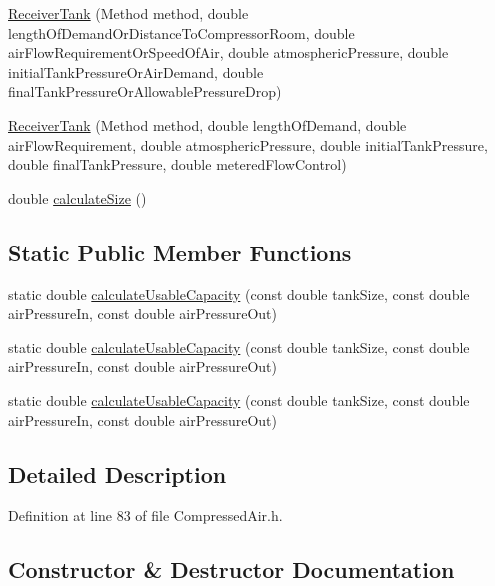 \begin{DoxyCompactItemize}
\item 
\hyperlink{class_receiver_tank_a499e102ca118bfe3bdff3584310207c2}{Receiver\+Tank} (Method method, double length\+Of\+Demand\+Or\+Distance\+To\+Compressor\+Room, double air\+Flow\+Requirement\+Or\+Speed\+Of\+Air, double atmospheric\+Pressure, double initial\+Tank\+Pressure\+Or\+Air\+Demand, double final\+Tank\+Pressure\+Or\+Allowable\+Pressure\+Drop)
\item 
\hyperlink{class_receiver_tank_aba0ca17714d1009c79d6dfcfaa3cea6a}{Receiver\+Tank} (Method method, double length\+Of\+Demand, double air\+Flow\+Requirement, double atmospheric\+Pressure, double initial\+Tank\+Pressure, double final\+Tank\+Pressure, double metered\+Flow\+Control)
\item 
double \hyperlink{class_receiver_tank_a5841344b63c444e4ceb9c3b7daeaf613}{calculate\+Size} ()
\end{DoxyCompactItemize}
\subsection*{Static Public Member Functions}
\begin{DoxyCompactItemize}
\item 
static double \hyperlink{class_receiver_tank_ad17f86b7de728d4796ee5b9663dcc577}{calculate\+Usable\+Capacity} (const double tank\+Size, const double air\+Pressure\+In, const double air\+Pressure\+Out)
\item 
static double \hyperlink{class_receiver_tank_ad17f86b7de728d4796ee5b9663dcc577}{calculate\+Usable\+Capacity} (const double tank\+Size, const double air\+Pressure\+In, const double air\+Pressure\+Out)
\item 
static double \hyperlink{class_receiver_tank_ad17f86b7de728d4796ee5b9663dcc577}{calculate\+Usable\+Capacity} (const double tank\+Size, const double air\+Pressure\+In, const double air\+Pressure\+Out)
\end{DoxyCompactItemize}


\subsection{Detailed Description}


Definition at line 83 of file Compressed\+Air.\+h.



\subsection{Constructor \& Destructor Documentation}
\mbox{\label{class_receiver_tank_ad41df65fb570224e135eae7b16c15b81}} 
